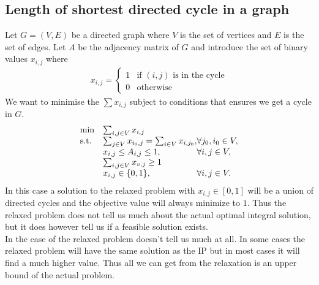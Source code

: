 \begin{example}
\subsection{Length of shortest directed cycle in a graph}
Let $G=(V,E)$ be a directed graph where $V$ is the set of vertices and $E$ is the set of edges. Let $A$ be the adjacency matrix of $G$ and introduce the set of binary values $x_{i,j}$ where
\begin{align*}
x_{i,j} = \left\{
\begin{array}{ll}
1 & \text{if } (i,j) \text{ is in the cycle} \\ 0 & \text{otherwise}
\end{array}\right.
\end{align*}
We want to minimise the $\sum x_{i,j}$ subject to conditions that ensures we get a cycle in $G$.
\begin{align}
\begin{array}{ll@{}ll}
\text{min} & \sum_{i,j \in V}x_{i,j}&\\
\text{s.t.} & \sum_{j\in V}x_{i_0,j} = \sum_{i\in V}x_{i,j_0},& \forall j_0,i_0 \in V,\\
&x_{i,j}\leq A_{i,j} \leq 1,&\forall i,j \in V,\\
&\sum_{i,j\in V}x_{v,j} \geq 1&\\
&x_{i,j} \in \{0,1\},&\forall i,j \in V.\\
\end{array}
\end{align}
In this case a solution to the relaxed problem with $x_{i,j} \in [0,1]$ will be a union of directed cycles and the objective value will always minimize to $1$. Thus the relaxed problem does not tell us much about the actual optimal integral solution, but it does however tell us if a feasible solution exists.\\
In the case of  the relaxed problem doesn't tell us much at all. In some cases the relaxed problem will have the same solution as the IP but in most cases it will find a much higher value. Thus all we can get from the relaxation is an upper bound of the actual problem.
\end{example}
